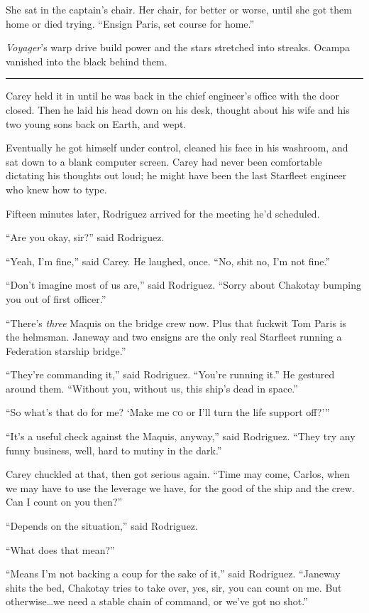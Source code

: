 \documentclass[twoside,letterpaper,12pt]{memoir}
\begin{document}
She sat in the captain’s chair. Her chair, for better or worse, until she got them home or died trying. ``Ensign Paris, set course for home.'' 

\textit{Voyager}’s warp drive build power and the stars stretched into streaks. Ocampa vanished into the black behind them. 

\fancybreak{\rule{3cm}{0.4 pt}} 

Carey held it in until he was back in the chief engineer’s office with the door closed. Then he laid his head down on his desk, thought about his wife and his two young sons back on Earth, and wept. 

Eventually he got himself under control, cleaned his face in his washroom, and sat down to a blank computer screen. Carey had never been comfortable dictating his thoughts out loud; he might have been the last Starfleet engineer who knew how to type. 

Fifteen minutes later, Rodriguez arrived for the meeting he’d scheduled. 

``Are you okay, sir?'' said Rodriguez. 

``Yeah, I’m fine,'' said Carey. He laughed, once. ``No, shit no, I’m not fine.'' 

``Don’t imagine most of us are,'' said Rodriguez. ``Sorry about Chakotay bumping you out of first officer.'' 

``There’s \textit{three} Maquis on the bridge crew now. Plus that fuckwit Tom Paris is the helmsman. Janeway and two ensigns are the only real Starfleet running a Federation starship bridge.'' 

``They’re commanding it,'' said Rodriguez. ``You’re running it.'' He gestured around them. ``Without you, without us, this ship’s dead in space.'' 

``So what’s that do for me? `Make me \textsc{co} or I’ll turn the life support off?''' 

``It’s a useful check against the Maquis, anyway,'' said Rodriguez. ``They try any funny business, well, hard to mutiny in the dark.'' 

Carey chuckled at that, then got serious again. ``Time may come, Carlos, when we may have to use the leverage we have, for the good of the ship and the crew. Can I count on you then?'' 

``Depends on the situation,'' said Rodriguez. 

``What does that mean?'' 

``Means I’m not backing a coup for the sake of it,'' said Rodriguez. ``Janeway shits the bed, Chakotay tries to take over, yes, sir, you can count on me. But otherwise\ldots we need a stable chain of command, or we’ve got no shot.'' 
\end{document}
